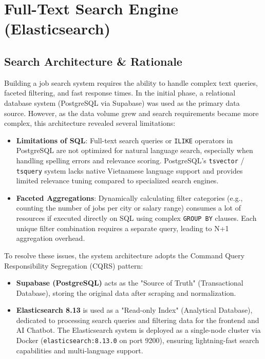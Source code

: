 \chapter{Full-Text Search Engine (Elasticsearch)}

\section{Search Architecture \& Rationale}

Building a job search system requires the ability to handle complex text queries, faceted filtering, and fast response times. In the initial phase, a relational database system (PostgreSQL via Supabase) was used as the primary data source. However, as the data volume grew and search requirements became more complex, this architecture revealed several limitations:

\begin{itemize}
\item \textbf{Limitations of SQL}: Full-text search queries or \texttt{ILIKE} operators in PostgreSQL are not optimized for natural language search, especially when handling spelling errors and relevance scoring. PostgreSQL's \texttt{tsvector} / \texttt{tsquery} system lacks native Vietnamese language support and provides limited relevance tuning compared to specialized search engines.
\item \textbf{Faceted Aggregations}: Dynamically calculating filter categories (e.g., counting the number of jobs per city or salary range) consumes a lot of resources if executed directly on SQL using complex \texttt{GROUP BY} clauses. Each unique filter combination requires a separate query, leading to N+1 aggregation overhead.
\end{itemize}

To resolve these issues, the system architecture adopts the Command Query Responsibility Segregation (CQRS) pattern:
\begin{itemize}
\item \textbf{Supabase (PostgreSQL)} acts as the "Source of Truth" (Transactional Database), storing the original data after scraping and normalization.
\item \textbf{Elasticsearch 8.13} is used as a "Read-only Index" (Analytical Database), dedicated to processing search queries and filtering data for the frontend and AI Chatbot. The Elasticsearch system is deployed as a single-node cluster via Docker (\texttt{elasticsearch:8.13.0} on port 9200), ensuring lightning-fast search capabilities and multi-language support.
\end{itemize}

